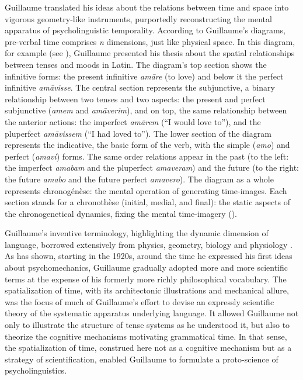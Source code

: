 \documentclass[output=paper]{langsci/langscibook}
\begin{document}
Guillaume translated his ideas about the relations between time and space into vigorous geometry-like instruments, purportedly reconstructing the mental apparatus of psycholinguistic temporality. According to Guillaume’s diagrams, pre-verbal time comprises \textit{n} dimensions, just like physical space. In this diagram, for example (see ), Guillaume presented his thesis about the spatial relationships between tenses and moods in Latin. The diagram’s top section shows the infinitive forms: the present infinitive \textit{am\textlatin{āre} }(to love) and below it the perfect infinitive \textit{am\textlatin{āvisse}}. The central section represents the subjunctive, a binary relationship between two tenses and two aspects: the present and perfect subjunctive (\textit{amem} and \textit{am\textlatin{āverim}}), and on top, the same relationship between the anterior actions: the imperfect \textit{am\textlatin{ārem}} (“I would love to”), and the pluperfect \textit{am\textlatin{āvissem} }(“I had loved to”). The lower section of the diagram represents the indicative, the basic form of the verb, with the simple (\textit{amo}) and perfect (\textit{amavi}) forms. The same order relations appear in the past (to the left: the imperfect \textit{amabam} and the pluperfect \textit{amaveram}) and the future (to the right: the future \textit{amabo} and the future perfect \textit{amavero}). The diagram as a whole represents chronogénèse: the mental operation of generating time\nobreakdash-images. Each section stands for a chronothèse (initial, medial, and final): the static aspects of the chronogenetical dynamics, fixing the mental time\nobreakdash-imagery (\citealt{boone_dictionnaire_1996}).

Guillaume’s inventive terminology, highlighting the dynamic dimension of language, borrowed extensively from physics, geometry, biology and physiology \citep{bottineau_terminologie_2006}. As \citet{valette_conceptualisation_2003} has shown, starting in the 1920s, around the time he expressed his first ideas about psychomechanics, Guillaume gradually adopted more and more scientific terms at the expense of his formerly more richly philosophical vocabulary. The spatialization of time, with its architectonic illustrations and mechanical allure, was the focus of much of Guillaume’s effort to devise an expressly scientific theory of the systematic apparatus underlying language. It allowed Guillaume not only to illustrate the structure of tense systems as he understood it, but also to theorize the cognitive mechanisms motivating grammatical time. In that sense, the spatialization of time, construed here not as a cognitive mechanism but as a strategy of scientification, enabled Guillaume to formulate a proto-science of psycholinguistics.
\end{document}
